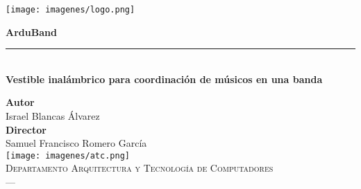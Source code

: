 \begin{titlepage}


\setlength{\centeroffset}{-0.5\oddsidemargin}
\addtolength{\centeroffset}{0.5\evensidemargin}
\thispagestyle{empty}

\noindent\hspace*{\centeroffset}\begin{minipage}{\textwidth}

\centering

\texttt{[image: imagenes/logo.png]}
 \vspace{0.5cm}


{\Huge\bfseries ArduBand\\
}
\noindent\rule[-1ex]{\textwidth}{3pt}\\[3.5ex]
{\large\bfseries Vestible inalámbrico para coordinación de músicos en una banda\\[4cm]}
\end{minipage}

\vspace{3cm}
\noindent\hspace*{\centeroffset}\begin{minipage}{\textwidth}
\centering

\textbf{Autor}\\ {Israel Blancas Álvarez}\\[2.5ex]
\textbf{Director}\\
{Samuel Francisco Romero García}\\[2.5cm]
\texttt{[image: imagenes/atc.png]}\\[0.1cm]
\textsc{Departamento Arquitectura y Tecnología de Computadores}\\
\textsc{---}\\
\end{minipage}
\addtolength{\textwidth}{\centeroffset}


\end{titlepage}
